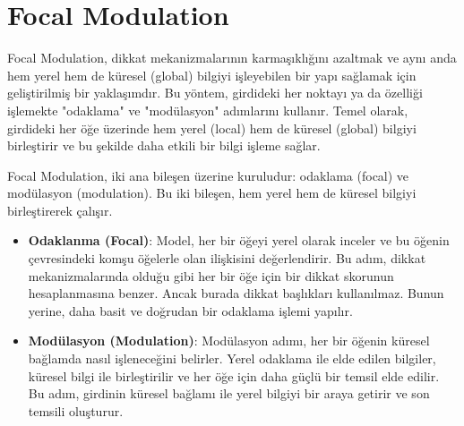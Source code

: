 \section{Focal Modulation}

Focal Modulation, dikkat mekanizmalarının karmaşıklığını azaltmak ve aynı anda hem yerel hem de küresel (global) bilgiyi işleyebilen bir yapı sağlamak için geliştirilmiş bir yaklaşımdır. Bu yöntem, girdideki her noktayı ya da özelliği işlemekte "odaklama" ve "modülasyon" adımlarını kullanır. Temel olarak, girdideki her öğe üzerinde hem yerel (local) hem de küresel (global) bilgiyi birleştirir ve bu şekilde daha etkili bir bilgi işleme sağlar. 

Focal Modulation, iki ana bileşen üzerine kuruludur: odaklama (focal) ve modülasyon (modulation). Bu iki bileşen, hem yerel hem de küresel bilgiyi birleştirerek çalışır.

\begin{itemize}
    \item \textbf{Odaklanma (Focal)}: Model, her bir öğeyi yerel olarak inceler ve bu öğenin çevresindeki komşu öğelerle olan ilişkisini değerlendirir. Bu adım, dikkat mekanizmalarında olduğu gibi her bir öğe için bir dikkat skorunun hesaplanmasına benzer. Ancak burada dikkat başlıkları kullanılmaz. Bunun yerine, daha basit ve doğrudan bir odaklama işlemi yapılır.
    \item \textbf{Modülasyon (Modulation)}: Modülasyon adımı, her bir öğenin küresel bağlamda nasıl işleneceğini belirler. Yerel odaklama ile elde edilen bilgiler, küresel bilgi ile birleştirilir ve her öğe için daha güçlü bir temsil elde edilir. Bu adım, girdinin küresel bağlamı ile yerel bilgiyi bir araya getirir ve son temsili oluşturur.
\end{itemize}

\newpage
